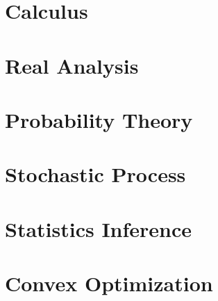 \documentclass{elegantbook}
\begin{document}
\tableofcontents
\mainmatter
\hypersetup{pageanchor=true}

\part{Calculus}




\part{Real Analysis}




\part{Probability Theory}






\part{Stochastic Process}


\part{Statistics Inference}






\part{Convex Optimization}


\end{document}
